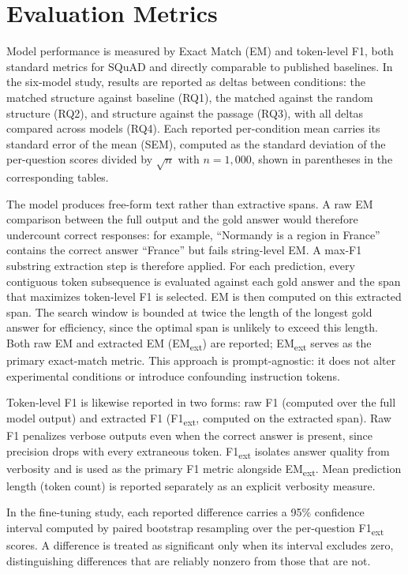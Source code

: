 \documentclass[master]{thesis}
\begin{document}
\section{Evaluation Metrics}
\label{sec:metrics}

Model performance is measured by Exact Match (EM) and token-level F1, both standard metrics for SQuAD and directly comparable to published baselines. In the six-model study, results are reported as deltas between conditions: the matched structure against baseline (RQ1), the matched against the random structure (RQ2), and structure against the passage (RQ3), with all deltas compared across models (RQ4). Each reported per-condition mean carries its standard error of the mean (SEM), computed as the standard deviation of the per-question scores divided by $\sqrt{n}$ with $n = 1{,}000$, shown in parentheses in the corresponding tables.

The model produces free-form text rather than extractive spans. A raw EM comparison between the full output and the gold answer would therefore undercount correct responses: for example, ``Normandy is a region in France'' contains the correct answer ``France'' but fails string-level EM. A max-F1 substring extraction step is therefore applied. For each prediction, every contiguous token subsequence is evaluated against each gold answer and the span that maximizes token-level F1 is selected. EM is then computed on this extracted span. The search window is bounded at twice the length of the longest gold answer for efficiency, since the optimal span is unlikely to exceed this length. Both raw EM and extracted EM (EM\textsubscript{ext}) are reported; EM\textsubscript{ext} serves as the primary exact-match metric. This approach is prompt-agnostic: it does not alter experimental conditions or introduce confounding instruction tokens.

Token-level F1 is likewise reported in two forms: raw F1 (computed over the full model output) and extracted F1 (F1\textsubscript{ext}, computed on the extracted span). Raw F1 penalizes verbose outputs even when the correct answer is present, since precision drops with every extraneous token. F1\textsubscript{ext} isolates answer quality from verbosity and is used as the primary F1 metric alongside EM\textsubscript{ext}. Mean prediction length (token count) is reported separately as an explicit verbosity measure.

In the fine-tuning study, each reported difference carries a 95\% confidence interval computed by paired bootstrap resampling over the per-question F1\textsubscript{ext} scores. A difference is treated as significant only when its interval excludes zero, distinguishing differences that are reliably nonzero from those that are not.
\end{document}
